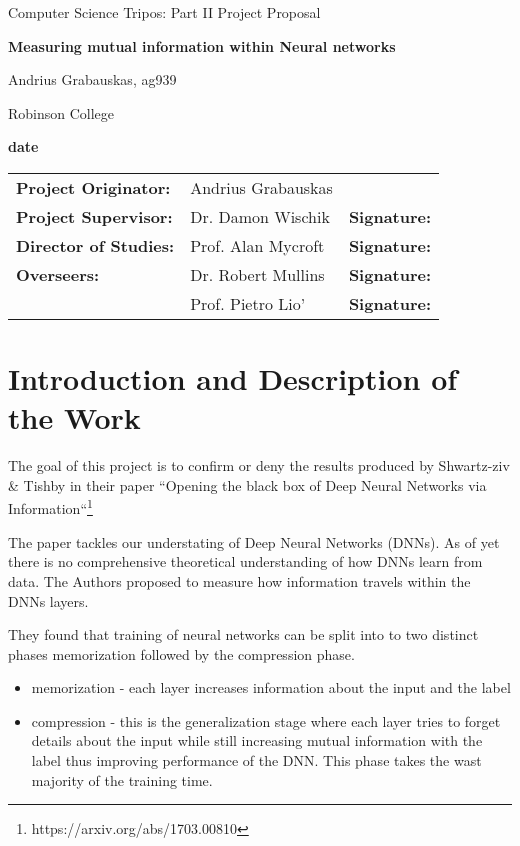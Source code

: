 \documentclass[12pt]{article}
\begin{document}
\thispagestyle{empty}

\centerline{\large Computer Science Tripos: Part II Project Proposal}
\vspace{0.4in}
\centerline{\Large\bf Measuring mutual information within Neural networks}
\vspace{0.3in}

\centerline{Andrius Grabauskas, ag939}
\centerline{Robinson College}

\centerline{\large \textbf{date}}

\vspace{1in}

\begin{tabular}{ p{4cm} p{4.5cm} l }
{\bf Project Originator:} & Andrius Grabauskas & \\[3mm]
{\bf Project Supervisor:} & Dr. Damon Wischik & {\bf Signature:} \\[3mm]
{\bf Director of Studies:} & Prof. Alan Mycroft & {\bf Signature:} \\[3mm]
{\bf Overseers:} & Dr. Robert Mullins & {\bf Signature:} \\[3mm]
                 & Prof. Pietro Lio' & {\bf Signature:} \\[3mm]
\end{tabular}

\vspace{0.75in}

\section*{Introduction and Description of the Work}

The goal of this project is to confirm or deny the results produced by
Shwartz-ziv \& Tishby in their paper ``Opening the black box of Deep Neural
Networks via Information``\footnote{https://arxiv.org/abs/1703.00810}

The paper tackles our understating of Deep Neural Networks (DNNs). As of yet
there is no comprehensive theoretical understanding of how DNNs learn from data.
The Authors proposed to measure how information travels within the DNNs layers.

They found that training of neural networks can be split into to two distinct
phases memorization followed by the compression phase.
\begin{itemize}
  \item memorization - each layer increases information about the input and the
    label
  \item compression  - this is the generalization stage where each layer tries
    to forget details about the input while still increasing mutual information
    with the label thus improving performance of the DNN. This phase takes the
    wast majority of the training time.
\end{itemize}
\end{document}
